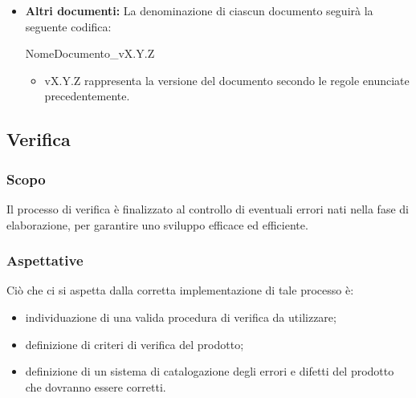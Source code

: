 \documentclass[11pt,a4paper]{article}
\begin{document}
{\begin{itemize}
		\begin{itemize}
			\item X rappresenta la data del verbale.
		\end{itemize}
		
		\item \textbf{Altri documenti:} La denominazione di ciascun documento seguirà la seguente codifica:
		\begin{center}
			NomeDocumento\_vX.Y.Z
		\end{center}
		
		\begin{itemize}
			\item vX.Y.Z rappresenta la versione del documento secondo le regole enunciate precedentemente.
		\end{itemize}
		
	\end{itemize}
	
	\newpage

	\subsection{Verifica}
	
	\subsubsection{Scopo}
	Il processo di verifica è finalizzato al controllo di eventuali errori nati nella fase di elaborazione, per garantire uno sviluppo efficace ed efficiente.
	
	\subsubsection{Aspettative}
	Ciò che ci si aspetta dalla corretta implementazione di tale processo è:
	\begin{itemize}
		\item individuazione di una valida procedura di verifica da utilizzare;
		\item definizione di criteri di verifica del prodotto;
		\item definizione di un sistema di catalogazione degli errori e difetti del prodotto che dovranno essere corretti.
	\end{itemize}	
	
	
}
\end{document}
